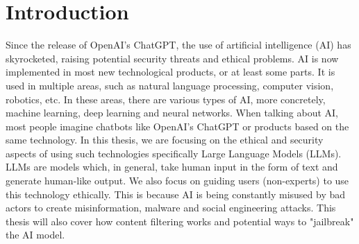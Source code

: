 \chapter{Introduction}



Since the release of OpenAI's ChatGPT, the use of artificial intelligence (AI) has skyrocketed, raising potential security threats and ethical problems. AI is now implemented in most new technological products, or at least some parts. It is used in multiple areas, such as natural language processing, computer vision, robotics, etc. In these areas, there are various types of AI, more concretely, machine learning, deep learning and neural networks. When talking about AI, most people imagine chatbots like OpenAI's ChatGPT or products based on the same technology. In this thesis, we are focusing on the ethical and security aspects of using such technologies specifically Large Language Models (LLMs). LLMs are models which, in general, take human input in the form of text and generate human-like output. We also focus on guiding users (non-experts) to use this technology ethically. This is because AI is being constantly misused by bad actors to create misinformation, malware and social engineering attacks. This thesis will also cover how content filtering works and potential ways to "jailbreak" the AI model.

